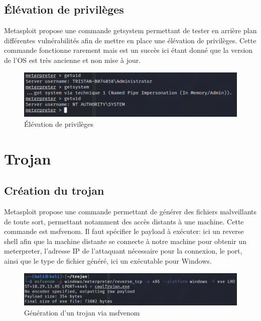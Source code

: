 \documentclass[12pt, oneside]{article}
\begin{document}
\subsection{Élévation de privilèges}
Metasploit propose une commande getsystem permettant de tester en arrière plan différentes vulnérabilités afin de mettre en place une élévation de privilèges. Cette commande fonctionne rarement mais est un succès ici étant donné que la version de l'OS est très ancienne et non mise à jour.
\begin{figure}[H]
\centering
\includegraphics[scale=0.4]{system}
\caption{Élévation de privilèges}
\end{figure}
\section{Trojan}
\subsection{Création du trojan}
Metasploit propose une commande permettant de générer des fichiers malveillants de toute sort, permettant notamment des accès distants à une machine. Cette commande est msfvenom. Il faut spécifier le payload à exécuter: ici un reverse shell afin que la machine distante se connecte à notre machine pour obtenir un meterpreter, l'adresse IP de l'attaquant nécessaire pour la connexion, le port, ainsi que le type de fichier généré, ici un exécutable pour Windows.
\begin{figure}[H]
\centering
\includegraphics[scale=0.4]{trojan}
\caption{Génération d'un trojan via msfvenom}
\end{figure}
\end{document}
